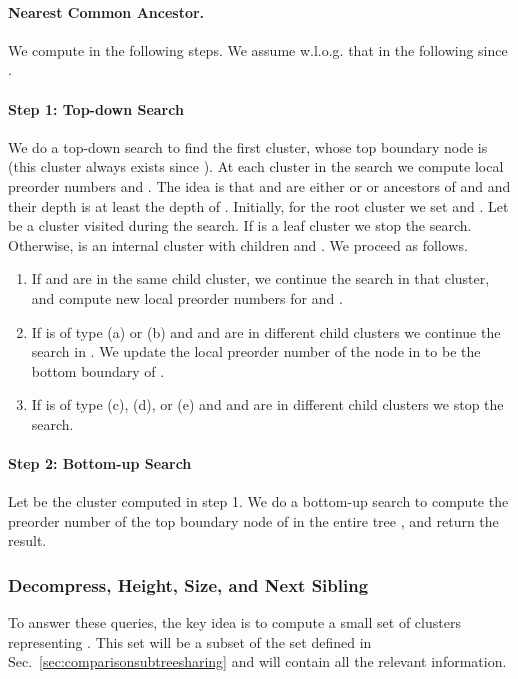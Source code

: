 \documentclass [11pt]{article}
\begin{document}
\paragraph{Nearest Common Ancestor.}
We compute  in the following steps. We assume w.l.o.g. that  in the following since .

\paragraph{Step 1: Top-down Search} We do a top-down search to find the first cluster, whose top boundary node is  (this cluster always exists since ). At each cluster  in the search we compute local preorder numbers  and . The idea is that   and  are either  or  or ancestors of  and  and their depth is at least the depth of . Initially, for the root cluster  we set  and . Let  be a cluster visited during the search. If  is a leaf cluster we stop the search. Otherwise,  is an internal cluster with children  and . We proceed as follows.
\begin{enumerate}
\item If  and  are in the same child cluster, we continue the search in that cluster, and compute new local preorder numbers for  and .
\item If  is of type (a) or (b) and  and  are in different child clusters we continue the search in . We update the local preorder number of the node in  to be the bottom boundary of .
\item If  is of type (c), (d), or (e) and  and  are in different child clusters we stop the search.
\end{enumerate}

\paragraph{Step 2: Bottom-up Search} Let  be the cluster computed in step 1. We do a bottom-up search to compute the preorder number of the top boundary node of  in the entire tree , and return the result. 

\subsubsection{Decompress, Height, Size, and Next Sibling}
To answer these queries,  the
key idea is to compute a small set of clusters representing . This set will be a subset of the set  defined in Sec.~\ref{sec:comparisonsubtreesharing} and will contain all the relevant information.
\end{document}

